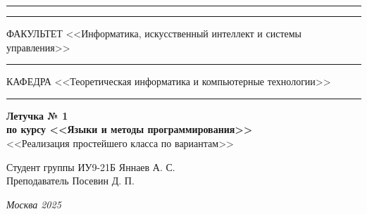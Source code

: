 \documentclass[a4paper, 14pt]{extarticle}
\begin{document}
\begin{titlepage}
\vspace{-25pt}
\hspace{-35pt}\rule{\textwidth}{2.3pt}

\vspace*{-20.3pt}
\hspace{-35pt}\rule{\textwidth}{0.4pt}

\vspace{1.5ex}
\hspace{-35pt} \noindent \small ФАКУЛЬТЕТ\hspace{30pt} <<Информатика, искусственный интеллект и системы управления>>

\vspace*{-16pt}
\hspace{47pt}\rule{0.83\textwidth}{0.4pt}

\vspace{0.5ex}
\hspace{-35pt} \noindent \small КАФЕДРА\hspace{50pt} <<Теоретическая информатика и компьютерные технологии>>

\vspace*{-16pt}
\hspace{30pt}\rule{0.866\textwidth}{0.4pt}

\vspace{11em}

\begin{center}
\Large {\bf Летучка  № 1} \\
\large {\bf по курсу <<Языки и методы программирования>>} \\
\large <<Реализация простейшего класса по вариантам>>
\end{center}\normalsize

\vspace{8em}


\begin{flushright}
  {Студент группы ИУ9-21Б Яннаев А. С. \hspace*{15pt}\\
  \vspace{2ex}
  Преподаватель Посевин Д. П.\hspace*{15pt}}
\end{flushright}

\bigskip

\vfill


\begin{center}
\textsl{Москва 2025}
\end{center}
\end{titlepage}
\end{document}
